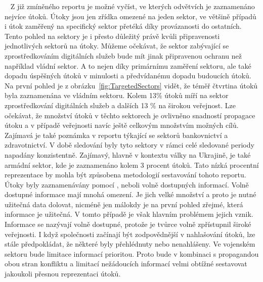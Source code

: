 ~
Z již zmíněného reportu\cite{Enisa_thread_landscape} je možné vyčíst, ve kterých odvětvích je zaznamenáno nejvíce útoků.
Útoky jsou jen zřídka omezené na jeden sektor, ve většině případů i útok zaměřený na specifický sektor přetéká díky provázanosti do ostatních.
Tento pohled na sektory je i přesto důležitý právě kvůli připravenosti jednotlivých sektorů na útoky.
Můžeme očekávat, že sektor zabývající se zprostředkováním digitálních služeb bude mít jinak připravenou ochranu než například vládní sektor.
A to nejen díky primárnímu zaměření sektoru, ale také dopadu úspěšných útoků v minulosti a předvídanému dopadu budoucích útoků.
Na první pohled je z obrázku~\ref{fig:TargetedSectors} vidět, že téměř čtvrtina útoků byla zaznamenána ve vládním sektoru.
Kolem 13\% útoků  míří na sektor zprostředkování digitálních služeb a dalších 13 \% na širokou veřejnost.
Lze očekávat, že množství útoků v těchto sektorech je ovlivněno snadností propagace útoku a v případě veřejnosti navíc ještě celkovým množstvím možných cílů.
Zajímavá je také poznámka v reportu týkající se sektorů bankovnictví a zdravotnictví.
V době sledování byly tyto sektory v rámci celé sledované periody napadány konzistentně.
Zajímavý, hlavně v kontextu války na Ukrajině, je také armádní sektor, kde je zaznamenáno kolem 3 procent útoků.
Tato nízká procentní reprezentace by mohla být způsobena metodologií sestavování tohoto reportu.
Útoky byly zaznamenávány pomocí , neboli volně dostupných informací\cite{moje_bakalarka}.
Volně dostupné informace mají mnohá omezení.
Je jich velké množství a proto je nutné užitečná data dolovat, nicméně jen málokdy je na první pohled zřejmé, která informace je užitečná.
V tomto případě je však hlavním problémem jejich vznik.
Informace se nazývají volně dostupné, protože je tvůrce volně zpřístupnil široké veřejnosti.
I když společnosti začínají být zodpovědnější v nahlašování útoků, lze stále předpokládat, že některé byly přehlédnuty nebo nenahlášeny.
Ve vojenském sektoru bude limitace informací prioritou.
Proto bude v kombinaci s propagandou obou stran konfliktu a limitací nežádoucích informací velmi obtížné sestavovat jakoukoli přesnou reprezentaci útoků.

